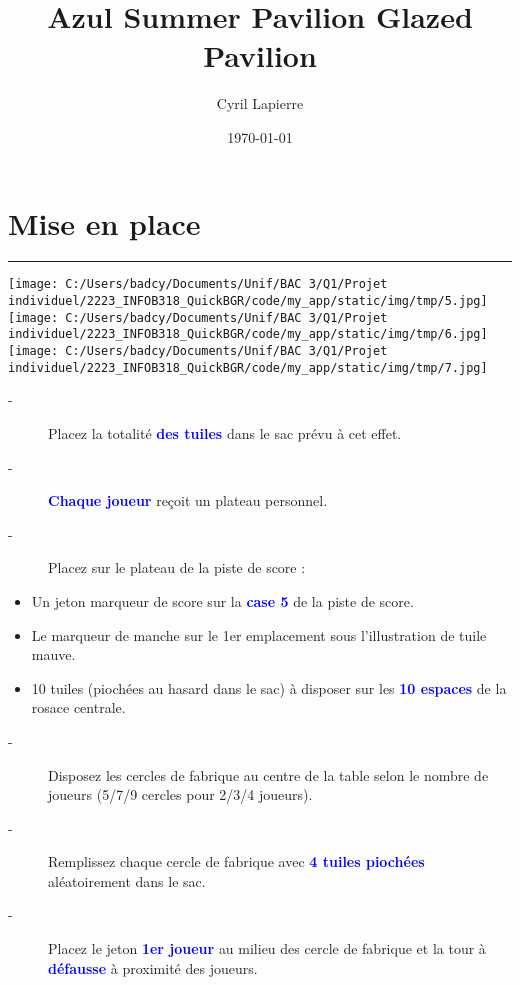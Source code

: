 \documentclass{scrartcl}%
\title{Azul Summer Pavilion Glazed Pavilion}%
\author{Cyril Lapierre}%
\date{\today}%
\begin{document}
%
\normalsize%
\maketitle\thispagestyle{header}%
\pagestyle{header}%
\sectionfont{\color{blue}}%
\subsectionfont{\color{blue}}%
\subsubsectionfont{\color{blue}}%
\section{ Mise en place
}%
\label{sec:Miseenplace}%
\textcolor{blue}{\rule{18cm}{0.07cm}}\break%
%
\texttt{[image: C:/Users/badcy/Documents/Unif/BAC 3/Q1/Projet individuel/2223\_INFOB318\_QuickBGR/code/my\_app/static/img/tmp/5.jpg]}%
%
\texttt{[image: C:/Users/badcy/Documents/Unif/BAC 3/Q1/Projet individuel/2223\_INFOB318\_QuickBGR/code/my\_app/static/img/tmp/6.jpg]}%
%
\texttt{[image: C:/Users/badcy/Documents/Unif/BAC 3/Q1/Projet individuel/2223\_INFOB318\_QuickBGR/code/my\_app/static/img/tmp/7.jpg]}%

%
\begin{description}%
\item[{-} ]%
%
 Placez la totalité %
\textcolor{blue}{%
\textbf{des tuiles}%
}%
\textit{ }%
 dans le sac prévu à cet effet.
%
\item[{-} ]%
%
\textcolor{blue}{%
\textbf{Chaque joueur}%
}%
\textit{ }%
 reçoit un plateau personnel.
%
\item[{-} ]%
%
 Placez sur le plateau de la piste de score :
%
\end{description}%
\begin{itemize}%
\item%
%
 Un jeton marqueur de score sur la %
\textcolor{blue}{%
\textbf{case 5}%
}%
\textit{ }%
 de la piste de score.
%
\item%
%
 Le marqueur de manche sur le 1er emplacement sous l’illustration de tuile mauve.
%
\item%
%
 10 tuiles (piochées au hasard dans le sac) à disposer sur les %
\textcolor{blue}{%
\textbf{10 espaces}%
}%
\textit{ }%
 de la rosace centrale.
%
\end{itemize}%
\begin{description}%
\item[{-} ]%
%
 Disposez les cercles de fabrique au centre de la table selon le nombre de joueurs (5/7/9 cercles pour 2/3/4 joueurs).
%
\item[{-} ]%
%
 Remplissez chaque cercle de fabrique avec %
\textcolor{blue}{%
\textbf{4 tuiles piochées}%
}%
\textit{ }%
 aléatoirement dans le sac.
%
\item[{-} ]%
%
 Placez le jeton %
\textcolor{blue}{%
\textbf{1er joueur}%
}%
\textit{ }%
 au milieu des cercle de fabrique et la tour à %
\textcolor{blue}{%
\textbf{défausse}%
}%
\textit{ }%
 à proximité des joueurs.
%
\end{description}
\end{document}
